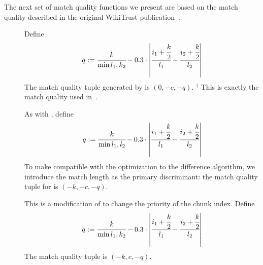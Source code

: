 The next set of match quality functions we present are
based on the match quality described in the
original WikiTrust publication~\cite{Adler2007}.
%
\begin{description}

\item[]
    Define
    \begin{equation*}
    q := \cfrac{k}{\min{l_1, k_2}} - 0.3 \cdot
        \left|\cfrac{ i_1 + \cfrac{k}{2} }{l_1}
            - \cfrac{ i_2 + \cfrac{k}{2} }{l_2} \right|
    \end{equation*}
    The match quality tuple generated by  is $(0, -c, -q)$.
    ${}^\dagger$
    This is exactly the match quality used in~\cite{Adler2007}.

\item[]
    As with , define
    \begin{equation*}
    q := \cfrac{k}{\min{l_1, l_2}} - 0.3 \cdot
        \left|\cfrac{ i_1 + \cfrac{k}{2} }{l_1}
            - \cfrac{ i_2 + \cfrac{k}{2} }{l_2} \right|
    \end{equation*}
    To make  compatible with the 
    optimization to the difference algorithm, we introduce the
    match length as the primary discriminant:
    the match quality tuple for  is $(-k, -c, -q)$.

\item[] This is a modification of 
    to change the priority of the chunk index.
    Define
    \begin{equation*}
    q := \cfrac{k}{\min{l_1, k_2}} - 0.3 \cdot
        \left|\cfrac{ i_1 + \cfrac{k}{2} }{l_1}
            - \cfrac{ i_2 + \cfrac{k}{2} }{l_2} \right|
    \end{equation*}
    The match quality tuple is $(-k, c, -q)$.

\end{description}

